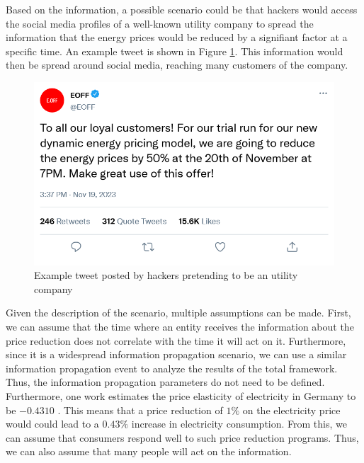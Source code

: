 Based on the information, a possible scenario could be that hackers would
access the social media profiles of a well-known utility company
to spread the information that the energy prices would be reduced by 
a signifiant factor at a specific time. An example tweet is shown in 
Figure \ref{demandtweet}. This information would then be 
spread around social media, reaching many customers of the company.

\begin{figure}[!ht]
    \center
    \includegraphics[scale=.4]{figs/eondemandresponse.png}
    \caption{Example tweet posted by hackers pretending to be an utility company}
    \label{demandtweet}
\end{figure}

Given the description of the scenario, multiple assumptions can be made.
First, we can assume that the time where an entity receives the information
about the price reduction does not correlate with the time it will act on
it. Furthermore, since it is a widespread information propagation scenario,
we can use a similar information propagation event to analyze the 
results of the total framework. Thus, the information propagation
parameters do not need to be defined. Furthermore, one work estimates 
the price elasticity of electricity in Germany to be $-0.4310$
\cite{priceelasticity}. 
This means that a price reduction of $1\%$
on the electricity price would could lead to a $0.43\%$ increase in
electricity consumption. From this, we can assume that consumers 
respond well to such price reduction programs. Thus, we can also assume 
that many people will act on the information.


